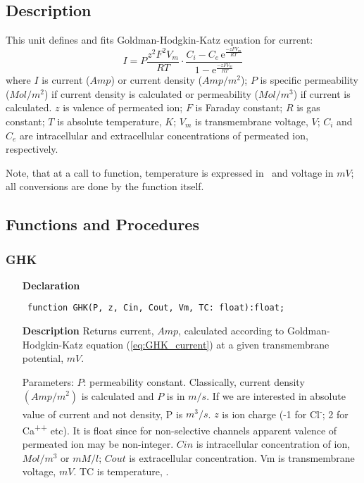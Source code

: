 \documentclass[12pt,a4paper,oneside]{report}
\newcommand{\euler}{\mathrm{e}}
\newcommand{\declarationitem}[1]{\textbf{#1}}
\newcommand{\descriptiontitle}[1]{\textbf{#1}}
\newcommand{\code}[1]{\texttt{#1}}
\begin{document}
\subsection{Description}
This unit defines and fits Goldman-Hodgkin-Katz equation for current:
\begin{equation}\label{eq:GHK_current}
I=P\dfrac{z^2F^2V_m}{RT}\cdot\dfrac{{C_i}-{C_e}\,\euler^{\frac{-zFV_m}{RT}}}{1-\euler^{\frac{-zFV_m}{RT}}}
\end{equation}
where $I$ is current ($Amp$) or current density ($Amp/m^2$); $P$ is specific permeability ($Mol/m^2$) if current density is calculated or permeability ($Mol/m^3$) if current is calculated. $z$ is valence of permeated ion; $F$ is Faraday constant; $R$ is gas constant; $T$ is absolute temperature, $K$; $V_m$ is transmembrane voltage, $V$; $C_{i}$ and $C_{e}$ are intracellular and extracellular concentrations of permeated ion, respectively.

Note, that at a call to function, temperature is expressed in \celsius\ and voltage in $mV$; all conversions are done by the function itself.   
\subsection{Functions and Procedures}
\subsubsection{GHK}
\label{ugoldman-GHK}
\begin{itemize}\item[\declarationitem{Declaration}\hfill]
	\begin{flushleft}
		\code{
			function GHK(P, z, Cin, Cout, Vm, TC: float):float;}
		
	\end{flushleft}
	
	\par
	\item[\descriptiontitle{Description}]
	Returns current, $Amp$, calculated according to Goldman-Hodgkin-Katz equation (\ref{eq:GHK_current}) at a given transmembrane potential, $mV$. 
	
	Parameters: $P$: permeability constant. Classically, current density $(Amp/m^2)$ is calculated and $P$ is in $m/s$. If we are interested in absolute value of current and not density, P is $m^3/s$. $z$ is ion charge (-1 for Cl\textsuperscript{-}; 2 for Ca\textsuperscript{++} etc). It is float since for non-selective channels apparent valence of permeated ion may be non-integer. $Cin$ is intracellular concentration of ion, $Mol/m^3$ or $mM/l$; $Cout$ is extracellular concentration. Vm is transmembrane voltage, $mV$. TC is temperature, \celsius.
	
\end{itemize}
\end{document}
